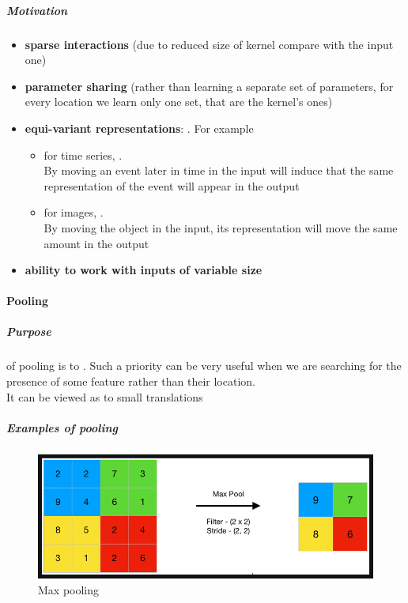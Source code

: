 \subparagraph{Motivation}
\begin{itemize}
    \item \textbf{sparse interactions} (due to reduced size of kernel compare with the 
        input one)
    \item \textbf{parameter sharing} (rather than learning a separate set of 
        parameters, for every location we learn only one set, that are the kernel's 
        ones)
    \item \textbf{equi-variant representations}: . For example 
        \begin{itemize}
            \item for time series, .\\
                By moving an event later in time in the input will induce that the same
                representation of the event will appear in the output
            \item for images, .\\
                By moving the object in the input, its representation will move the 
                same amount in the output
        \end{itemize}
    \item \textbf{ability to work with inputs of variable size}
\end{itemize}


\paragraph{Pooling}
\subparagraph{Purpose} of pooling is to . Such a priority can be very
useful when we are searching for the presence of some feature rather than their 
location.\\
It can be viewed as  to small translations

\subparagraph{Examples of pooling}
\begin{figure}[H]
    \begin{center}
        \includegraphics[width=.5\textwidth]{./chapters/4_deep_learning/3_types_of_neural_networks/images/02_pooling_max.png}
    \end{center}
    \caption{Max pooling}
    \label{fig:02_pooling_max}
\end{figure}



